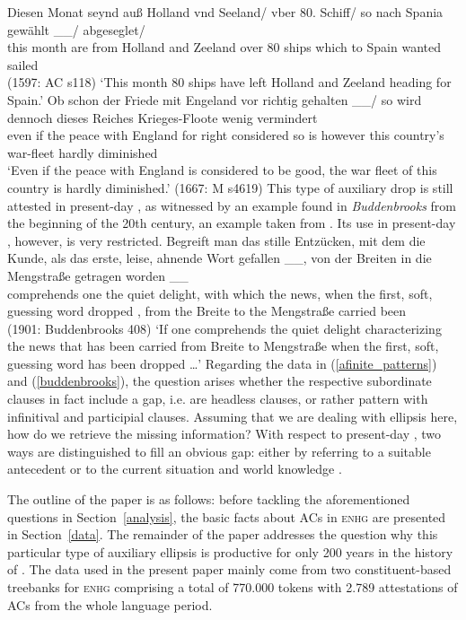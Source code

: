 \documentclass[output=paper,colorlinks,citecolor=brown]{langscibook}
\begin{document}
\ex \label{rc_intro}
\gll Diesen Monat seynd auß Holland vnd Seeland/ vber 80. Schiff/ so nach Spania gewählt \_\_/ abgeseglet/  \\ this month are from Holland and Zeeland over 80 ships which to Spain wanted {} sailed \\ \hfill (1597: AC s118)
\glt `This month 80 ships have left Holland and Zeeland heading for Spain.'
\ex \label{ac_intro}
\gll Ob schon der Friede mit Engeland vor richtig gehalten  \_\_/ so wird dennoch dieses Reiches Krieges-Floote wenig vermindert \\ even if the peace with England for right considered {}  so is however this country's war-fleet hardly diminished  \\ 
\glt `Even if the peace with England is considered to be good, the war fleet of this country is hardly diminished.' \hfill (1667: M s4619)
\zl
This type of auxiliary drop is still attested in present-day , as witnessed by an example found in \textit{Buddenbrooks} from the beginning of the 20th century, an example taken from \citet{schroeder85}. Its use in present-day , however, is very restricted.
\ea \label{buddenbrooks}
\gll Begreift man das stille Entzücken, mit dem die Kunde, als das erste, leise, ahnende Wort gefallen \_\_, von der Breiten in die Mengstraße getragen worden \_\_ \\ comprehends one the quiet delight, with which the news, when the first, soft, guessing word dropped {}, from the Breite to the Mengstraße carried been    \\ \hfill (1901: Buddenbrooks 408)
\glt `If one comprehends the quiet delight characterizing the news that has been carried from Breite to Mengstraße when the first, soft, guessing word has been dropped \dots'
\z
Regarding the data in (\ref{afinite_patterns}) and (\ref{buddenbrooks}), the question arises whether the respective subordinate clauses in fact include a gap, i.e. are headless clauses, or rather pattern with infinitival and participial clauses. Assuming that we are dealing with ellipsis here, how do we retrieve the missing information? With respect to present-day , two ways are distinguished to fill an obvious gap: either by referring to a suitable antecedent or to the current situation and world knowledge \citep{reich2011}.

The outline of the paper is as follows: before tackling the aforementioned questions in Section~\ref{analysis}, the basic facts about ACs in \textsc{enhg} are presented in Section~\ref{data}. The remainder of the paper addresses the question why this particular type of auxiliary ellipsis is productive for only 200 years in the history of . The data used in the present paper mainly come from two constituent-based treebanks for \textsc{enhg} comprising a total of 770.000 tokens with 2.789 attestations of ACs from the whole language period. 
\end{document}

